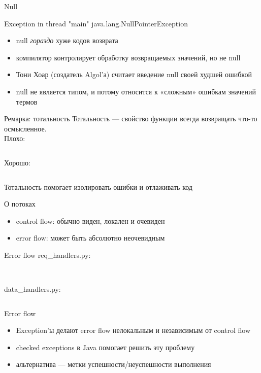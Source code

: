 \documentclass[10pt]{beamer}
\newcommand{\code}[4]{\inputminted[linenos, frame=none, firstline=#2, lastline=#3,
  framesep=10pt, bgcolor=lightgray]{#4}{#1}}
\begin{document}
\begin{frame}{Null}
  \begin{block}{}
    Exception in thread "main" java.lang.NullPointerException
  \end{block}
  \begin{itemize}
  \item null \emph{гораздо} хуже кодов возврата
  \item компилятор контролирует обработку возвращаемых значений, но не null
  \item Тони Хоар (создатель Algol'а) считает введение null своей худшей ошибкой
  \item null не является типом, и потому относится к «сложным» ошибкам значений термов
  \end{itemize}
\end{frame}

\begin{frame}{Ремарка: тотальность}
  Тотальность — свойство функции всегда возвращать что-то осмысленное.\\
  Плохо:
  \code{code.py}{21}{22}{python}
  Хорошо:
  \code{code.py}{24}{26}{python}
  Тотальность помогает изолировать ошибки и отлаживать код
\end{frame}

\begin{frame}{О потоках}
  \begin{itemize}
  \item control flow: обычно виден, локален и очевиден
  \item error flow: может быть абсолютно неочевидным
  \end{itemize}
\end{frame}

\begin{frame}{Error flow}
  req\_handlers.py:
  \code{code.py}{28}{32}{python}\vspace{5pt}\\
  data\_handlers.py:
  \code{code.py}{34}{38}{python}
\end{frame}

\begin{frame}{Error flow}
  \begin{itemize}
  \item Exception'ы делают error flow нелокальным и независимым от control flow
  \item checked exceptions в Java помогает решить эту проблему
  \item альтернатива — метки успешности/неуспешности выполнения
  \end{itemize}
\end{frame}
\end{document}
